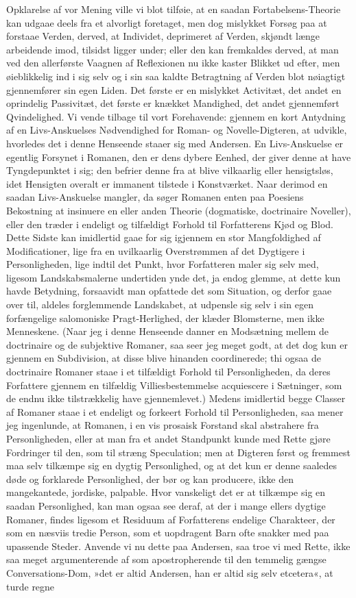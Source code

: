 \documentclass[12pt,a4paper]{article}
\begin{document}
Opklarelse af vor Mening ville vi blot tilføie, at en saadan Fortabelsens-Theorie kan udgaae deels fra et alvorligt foretaget, men dog mislykket Forsøg paa at forstaae Verden, derved, at Individet, deprimeret af Verden, skjøndt længe arbeidende imod, tilsidst ligger under; eller den kan fremkaldes derved, at man ved den allerførste Vaagnen af Reflexionen nu ikke kaster Blikket ud efter, men øieblikkelig ind i sig selv og i sin saa kaldte Betragtning af Verden blot nøiagtigt gjennemfører sin egen Liden. Det første er en mislykket Activitæt, det andet en oprindelig Passivitæt, det første er knækket Mandighed, det andet gjennemført Qvindelighed. Vi vende tilbage til vort Forehavende: gjennem en kort Antydning af en Livs-Anskuelses Nødvendighed for Roman- og Novelle-Digteren, at udvikle, hvorledes det i denne Henseende staaer sig med Andersen. En Livs-Anskuelse er egentlig Forsynet i Romanen, den er dens dybere Eenhed, der giver denne at have Tyngdepunktet i sig; den befrier denne fra at blive vilkaarlig eller hensigtsløs, idet Hensigten overalt er immanent tilstede i Konstværket. Naar derimod en saadan Livs-Anskuelse mangler, da søger Romanen enten paa Poesiens Bekostning at insinuere en eller anden Theorie (dogmatiske, doctrinaire Noveller), eller den træder i endeligt og tilfældigt Forhold til Forfatterens Kjød og Blod. Dette Sidste kan imidlertid gaae for sig igjennem en stor Mangfoldighed af Modificationer, lige fra en uvilkaarlig Overstrømmen af det Dygtigere i Personligheden, lige indtil det Punkt, hvor Forfatteren maler sig selv med, ligesom Landskabsmalerne undertiden ynde det, ja endog glemme, at dette kun havde Betydning, forsaavidt man opfattede det som Situation, og derfor gaae over til, aldeles forglemmende Landskabet, at udpensle sig selv i sin egen forfængelige salomoniske Pragt-Herlighed, der klæder Blomsterne, men ikke Menneskene. (Naar jeg i denne Henseende danner en Modsætning mellem de doctrinaire og de subjektive Romaner, saa seer jeg meget godt, at det dog kun er gjennem en Subdivision, at disse blive hinanden coordinerede; thi ogsaa de doctrinaire Romaner staae i et tilfældigt Forhold til Personligheden, da deres Forfattere gjennem en tilfældig Villiesbestemmelse acquiescere i Sætninger, som de endnu ikke tilstrækkelig have gjennemlevet.) Medens imidlertid begge Classer af Romaner staae i et endeligt og forkeert Forhold til Personligheden, saa mener jeg ingenlunde, at Romanen, i en vis prosaisk Forstand skal abstrahere fra Personligheden, eller at man fra et andet Standpunkt kunde med Rette gjøre Fordringer til den, som til stræng Speculation; men at Digteren først og fremmest maa selv tilkæmpe sig en dygtig Personlighed, og at det kun er denne saaledes døde og forklarede Personlighed, der bør og kan producere, ikke den mangekantede, jordiske, palpable. Hvor vanskeligt det er at tilkæmpe sig en saadan Personlighed, kan man ogsaa see deraf, at der i mange ellers dygtige Romaner, findes ligesom et Residuum af Forfatterens endelige Charakteer, der som en næsviis tredie Person, som et uopdragent Barn ofte snakker med paa upassende Steder. Anvende vi nu dette paa Andersen, saa troe vi med Rette, ikke saa meget argumenterende af som apostropherende til den temmelig gængse Conversations-Dom, »det er altid Andersen, han er altid sig selv etcetera«, at turde regne 
\end{document}
